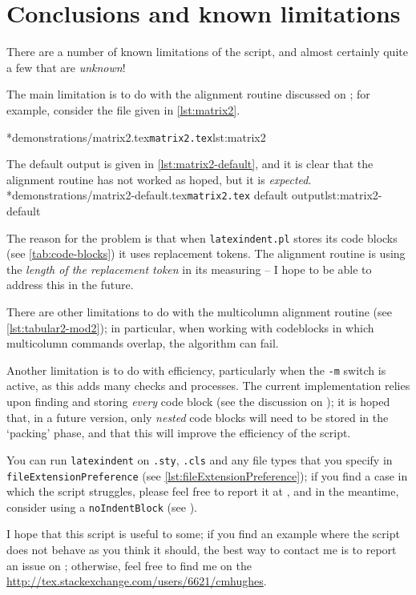\section{Conclusions and known limitations}\label{sec:knownlimitations}
 There are a number of known limitations of the script, and almost certainly quite a
 few that are \emph{unknown}!

 The main limitation is to do with the alignment routine discussed on ; for example,
 consider the file given in \cref{lst:matrix2}.

 \cmhlistingsfromfile*[showspaces=false,showtabs=false]*{demonstrations/matrix2.tex}{\texttt{matrix2.tex}}{lst:matrix2}

 The default output is given in \cref{lst:matrix2-default}, and it is clear that the alignment routine
 has not worked as hoped, but it is \emph{expected}.
 \cmhlistingsfromfile*[showspaces=false,showtabs=false]*{demonstrations/matrix2-default.tex}{\texttt{matrix2.tex} default output}{lst:matrix2-default}

 The reason for the problem is that when \texttt{latexindent.pl} stores its code blocks (see \vref{tab:code-blocks})
 it uses replacement tokens. The alignment routine is using the \emph{length of the replacement token} in its measuring -- I hope
 to be able to address this in the future.

 There are other limitations to do with the multicolumn alignment routine (see \vref{lst:tabular2-mod2}); in particular,
 when working with codeblocks in which multicolumn commands overlap, the algorithm can fail.

 Another limitation is to do with efficiency, particularly when the \texttt{-m}
 switch is active, as this adds many checks and processes. The current implementation
 relies upon finding and storing \emph{every} code block (see the discussion on );
 it is hoped that, in a future version, only \emph{nested} code blocks will need
 to be stored in the `packing' phase, and that this will improve the efficiency of the script.

 You can run \texttt{latexindent} on \texttt{.sty}, \texttt{.cls} and any file types
 that you specify in \lstinline[breaklines=true]!fileExtensionPreference! (see \vref{lst:fileExtensionPreference});
 if you find a case in which the script struggles, please feel free
 to report it at \cite{latexindent-home}, and
 in the meantime, consider using a \texttt{noIndentBlock} (see ).

 I hope that this script is useful to some; if you find an example where the
 script does not behave as you think it should, the best way to contact me is to
 report an issue on \cite{latexindent-home}; otherwise, feel free to find me on
 the \url{http://tex.stackexchange.com/users/6621/cmhughes}.
